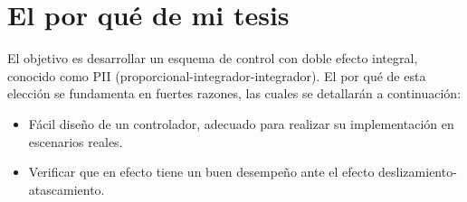 \section{El por qué de mi tesis}
El objetivo es desarrollar un esquema de control con doble efecto integral, conocido como PII (proporcional-integrador-integrador). El por qué de esta elección se fundamenta en fuertes razones, las cuales se detallarán a continuación:
\begin{itemize}
 \item Fácil diseño de un controlador, adecuado para realizar su implementación en escenarios reales.
 \item Verificar que en efecto tiene un buen desempeño ante el efecto deslizamiento-atascamiento.
\end{itemize}
